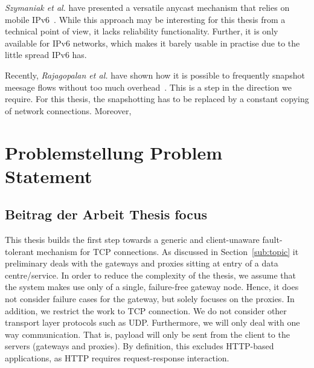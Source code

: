 \documentclass[10pt,a4paper,oneside]{scrartcl}
\newcommand\hint[2]{
\ifthenelse{\boolean{showhints}}{
\begin{center}
\colorbox{black!10}{
\begin{minipage}{.963\textwidth}
#2\hfill\textbf{#1}
\end{minipage}
}\end{center}}{}
}
\begin{document}
	\emph{Szymaniak et al.} have presented a versatile anycast mechanism that relies on mobile
	IPv6~\cite{szymaniak06versatile}. While this approach may be interesting for this thesis 
	from a technical point of view, it lacks reliability functionality. Further, it is only
	available for IPv6 networks, which makes it barely usable in practise due to the little
	spread IPv6 has. 

	Recently, \emph{Rajagopalan et al.} have shown how it is possible to frequently snapshot
	meesage flows without too much overhead~\cite{rajagopalan13pico}. This is a step in the
	direction we require. For this thesis, the snapshotting has to be replaced by a constant 
	copying of network connections. Moreover, 



\section{
	{Problemstellung}
	{Problem Statement}}
\label{sec:problem_statement}

\subsection{
	{Beitrag der Arbeit}
	{Thesis focus}}
\label{sub:focus}


This thesis builds the first step towards a generic and client-unaware fault-tolerant mechanism for
TCP connections. As discussed in Section~\ref{sub:topic} it preliminary deals with the gateways and
proxies sitting at entry of a data centre/service. In order to reduce the complexity of the thesis,
we assume that the system makes use only of a single, failure-free gateway node. Hence, it does not
consider failure cases for the gateway, but solely focuses on the proxies. In addition, we restrict
the work to TCP connection. We do not consider other transport layer protocols such as UDP. 
Furthermore, we will only deal with one way communication. That is, payload will only be sent from
the client to the servers (gateways and proxies). By definition, this excludes HTTP-based
applications, as HTTP requires request-response interaction.
\end{document}
